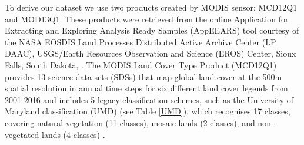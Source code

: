 To derive our dataset we use two products created by MODIS sensor: MCD12Q1 and MOD13Q1. These products were retrieved from the online Application for Extracting and Exploring Analysis Ready Samples (AppEEARS) tool courtesy of the NASA EOSDIS Land Processes Distributed Active Archive Center (LP DAAC), USGS/Earth Resources Observation and Science (EROS) Center, Sioux Falls, South Dakota, \citep{didan_2015,didan_munoz_2015,sulla_2015,sulla2_2018}. The MODIS Land Cover Type Product (MCD12Q1) provides 13 science data sets (SDSs) that map global land cover at the 500m spatial resolution in annual time steps for six different land cover legends from 2001-2016 and includes 5 legacy classification schemes, such as the University of Maryland classification (UMD) (see Table \ref{UMD}), which recognises 17 classes, covering natural vegetation (11 classes), mosaic lands (2 classes), and non-vegetated lands (4 classes) \citep{setiawan_2014, friedl_2018}. 

